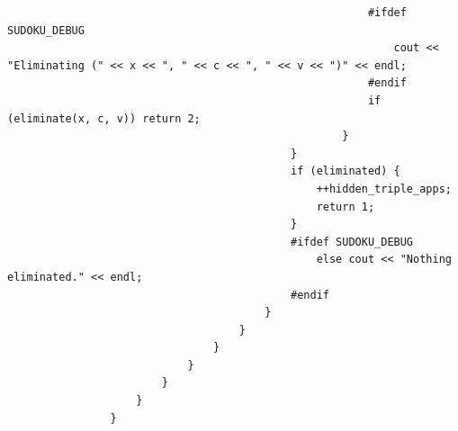 \documentclass{article}
\begin{document}
\begin{lstlisting}
                                                        #ifdef SUDOKU_DEBUG
                                                            cout << "Eliminating (" << x << ", " << c << ", " << v << ")" << endl;
                                                        #endif
                                                        if (eliminate(x, c, v)) return 2;
                                                    }
                                            }
                                            if (eliminated) {
                                                ++hidden_triple_apps;
                                                return 1;
                                            }
                                            #ifdef SUDOKU_DEBUG
                                                else cout << "Nothing eliminated." << endl;
                                            #endif
                                        }
                                    }
                                }
                            }
                        }
                    }
                }


\end{lstlisting}
\end{document}

